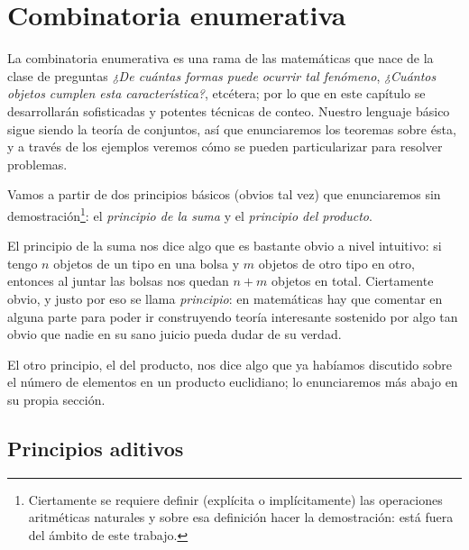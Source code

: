 \documentclass{book}
\theoremstyle{definition}
\begin{document}







\chapter{Combinatoria enumerativa}
\label{ch_combinatoriaEnumerativa}
La combinatoria enumerativa es una rama de las matemáticas que nace de la clase de preguntas \emph{¿De cuántas formas puede ocurrir tal fenómeno}, \emph{¿Cuántos objetos cumplen esta característica?}, etcétera; por lo que en este capítulo se desarrollarán  sofisticadas y potentes técnicas de conteo. Nuestro lenguaje básico sigue siendo la teoría de conjuntos, así que enunciaremos los teoremas sobre ésta, y a través de los ejemplos veremos cómo se pueden particularizar para resolver problemas.

Vamos a partir de dos principios básicos (obvios tal vez) que enunciaremos sin demostración\footnote{Ciertamente se requiere definir (explícita o implícitamente) las operaciones aritméticas naturales y sobre esa definición hacer la demostración: está fuera del ámbito de este trabajo.}: el \emph{principio de la suma} y el \emph{principio del producto}.

El principio de la suma nos dice algo que es bastante obvio a nivel intuitivo: si tengo $n$ objetos de un tipo en una bolsa y $m$ objetos de otro tipo en otro, entonces al juntar las bolsas nos quedan $n+m$ objetos en total.
Ciertamente obvio, y justo por eso se llama \emph{principio}: en matemáticas hay que comentar en alguna parte para poder ir construyendo teoría interesante sostenido por algo tan obvio que nadie en su sano juicio pueda dudar de su verdad.

El otro principio, el del producto, nos dice algo que ya habíamos discutido %
sobre el número de elementos en un producto euclidiano; lo enunciaremos más abajo en su propia sección.

\section{Principios aditivos}
\end{document}
